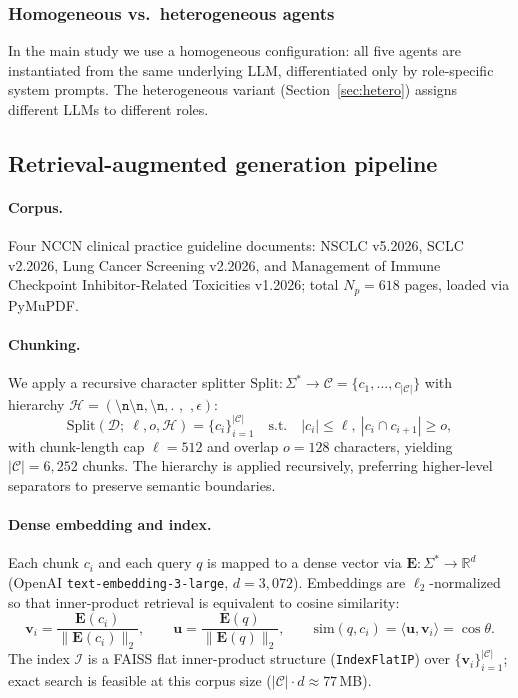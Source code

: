 \documentclass[final, 11pt, 3p]{elsarticle}
\begin{document}
\subsubsection{Homogeneous vs.\ heterogeneous agents}
In the main study we use a homogeneous configuration: all five agents
are instantiated from the same underlying LLM, differentiated only by
role-specific system prompts. The heterogeneous variant
(Section~\ref{sec:hetero}) assigns different LLMs to different roles.

\subsection{Retrieval-augmented generation pipeline}
\label{sec:rag}

\paragraph{Corpus.} Four NCCN clinical practice guideline documents:
NSCLC v5.2026, SCLC v2.2026, Lung Cancer Screening v2.2026, and
Management of Immune Checkpoint Inhibitor-Related Toxicities v1.2026;
total $N_p = 618$ pages, loaded via PyMuPDF.

\paragraph{Chunking.} We apply a recursive character splitter
$\mathrm{Split}: \Sigma^{*} \to \mathcal{C} = \{c_1, \ldots, c_{|\mathcal{C}|}\}$
with hierarchy $\mathcal{H} = (\texttt{\textbackslash n\textbackslash n},
\texttt{\textbackslash n}, \texttt{.~}, \texttt{~}, \epsilon)$:
\begin{equation}
\mathrm{Split}(\mathcal{D};\ \ell, o, \mathcal{H})
= \{c_i\}_{i=1}^{|\mathcal{C}|}\quad \text{s.t.}\quad |c_i| \leq \ell,\ |c_i \cap c_{i+1}| \geq o,
\label{eq:chunk}
\end{equation}
with chunk-length cap $\ell = 512$ and overlap $o = 128$ characters,
yielding $|\mathcal{C}| = 6{,}252$ chunks. The hierarchy is applied
recursively, preferring higher-level separators to preserve semantic
boundaries.

\paragraph{Dense embedding and index.} Each chunk $c_i$ and each query
$q$ is mapped to a dense vector via
$\mathbf{E}: \Sigma^{*} \to \mathbb{R}^{d}$ (OpenAI
\texttt{text-embedding-3-large}, $d = 3{,}072$). Embeddings are
$\ell_2$-normalized so that inner-product retrieval is equivalent to
cosine similarity:
\begin{equation}
\mathbf{v}_i = \frac{\mathbf{E}(c_i)}{\lVert \mathbf{E}(c_i) \rVert_2},\qquad
\mathbf{u} = \frac{\mathbf{E}(q)}{\lVert \mathbf{E}(q) \rVert_2},\qquad
\mathrm{sim}(q, c_i) = \langle \mathbf{u}, \mathbf{v}_i \rangle = \cos\theta.
\label{eq:sim}
\end{equation}
The index $\mathcal{I}$ is a FAISS \cite{Johnson2019FAISS,Douze2024FAISS}
flat inner-product structure (\texttt{IndexFlatIP}) over
$\{\mathbf{v}_i\}_{i=1}^{|\mathcal{C}|}$; exact search is feasible at
this corpus size ($|\mathcal{C}| \cdot d \approx 77$\,MB).
\end{document}
